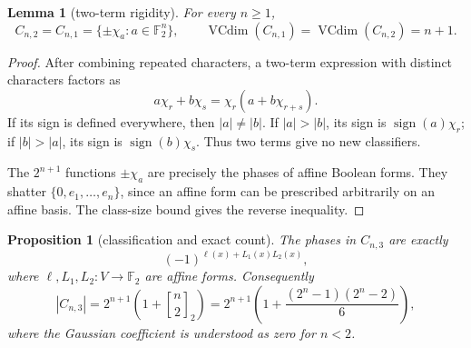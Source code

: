 \documentclass[11pt]{article}
\newtheorem{proposition}[theorem]{Proposition}
\newtheorem{lemma}[theorem]{Lemma}
\newcommand{\F}{\mathbb F}
\newcommand{\VC}{\operatorname{VCdim}}
\newcommand{\sign}{\operatorname{sign}}
\newcommand{\qbinom}[2]{\genfrac{[}{]}{0pt}{}{#1}{#2}_2}
\begin{document}
\begin{lemma}[two-term rigidity]\label{lem:two}
For every \(n\ge1\),
\[
 C_{n,2}=C_{n,1}=\{\pm\chi_a:a\in\F_2^n\},
 \qquad
 \VC(C_{n,1})=\VC(C_{n,2})=n+1.
\]
\end{lemma}

\begin{proof}
After combining repeated characters, a two-term expression with distinct
characters factors as
\[
 a\chi_r+b\chi_s=\chi_r(a+b\chi_{r+s}).
\]
If its sign is defined everywhere, then \(|a|\ne|b|\).  If
\(|a|>|b|\), its sign is \(\sign(a)\chi_r\); if \(|b|>|a|\), its sign is
\(\sign(b)\chi_s\).  Thus two terms give no new classifiers.

The \(2^{n+1}\) functions \(\pm\chi_a\) are precisely the phases of affine
Boolean forms.  They shatter \(\{0,e_1,\ldots,e_n\}\), since an affine form
can be prescribed arbitrarily on an affine basis.  The class-size bound gives
the reverse inequality.
\end{proof}

\begin{proposition}[classification and exact count]\label{prop:class}
The phases in \(C_{n,3}\) are exactly
\begin{equation}\label{eq:quadratic-class}
 (-1)^{\ell(x)+L_1(x)L_2(x)},
\end{equation}
where \(\ell,L_1,L_2:V\to\F_2\) are affine forms.  Consequently
\begin{equation}\label{eq:count}
 |C_{n,3}|=2^{n+1}\left(1+\qbinom{n}{2}\right)
 =2^{n+1}\left(1+\frac{(2^n-1)(2^n-2)}6\right),
\end{equation}
where the Gaussian coefficient is understood as zero for \(n<2\).
\end{proposition}
\end{document}
